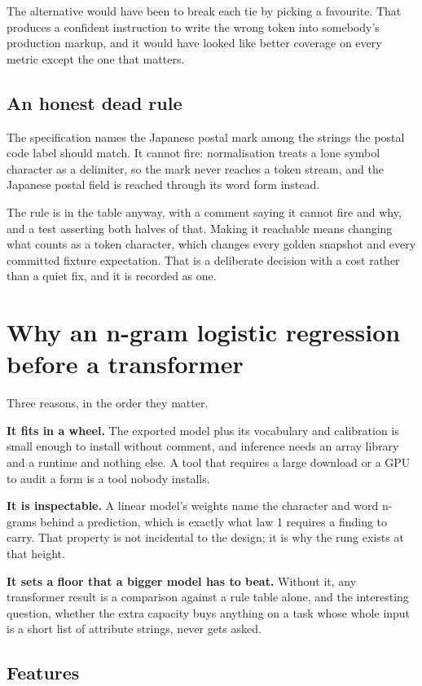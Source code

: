 The alternative would have been to break each tie by picking a favourite. That
produces a confident instruction to write the wrong token into somebody's
production markup, and it would have looked like better coverage on every metric
except the one that matters.

\subsection{An honest dead rule}

The specification names the Japanese postal mark among the strings the postal
code label should match. It cannot fire: normalisation treats a lone symbol
character as a delimiter, so the mark never reaches a token stream, and the
Japanese postal field is reached through its word form instead.

The rule is in the table anyway, with a comment saying it cannot fire and why,
and a test asserting both halves of that. Making it reachable means changing what
counts as a token character, which changes every golden snapshot and every
committed fixture expectation. That is a deliberate decision with a cost rather
than a quiet fix, and it is recorded as one.

\section{Why an n-gram logistic regression before a transformer}

Three reasons, in the order they matter.

\textbf{It fits in a wheel.} The exported model plus its vocabulary and
calibration is small enough to install without comment, and inference needs an
array library and a runtime and nothing else. A tool that requires a large
download or a GPU to audit a form is a tool nobody installs.

\textbf{It is inspectable.} A linear model's weights name the character and word
n-grams behind a prediction, which is exactly what law 1 requires a finding to
carry. That property is not incidental to the design; it is why the rung exists
at that height.

\textbf{It sets a floor that a bigger model has to beat.} Without it, any
transformer result is a comparison against a rule table alone, and the
interesting question, whether the extra capacity buys anything on a task whose
whole input is a short list of attribute strings, never gets asked.

\subsection{Features}


